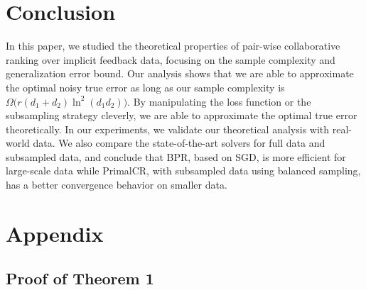\documentclass[conference]{IEEEtran}
\numberwithin{equation}{section}
\newtheorem{sampling strategy}{Sampling Strategy}
\begin{document}
\section{Conclusion}
\label{sec:conclusion}

In this paper, we studied the theoretical properties of pair-wise collaborative ranking  over implicit feedback data, focusing on the sample complexity and generalization error bound. Our analysis shows that we are able to approximate the optimal noisy true error as long as our sample complexity is $\Omega \big( r(d_1+d_2)\ln^2(d_1d_2) \big)$. By manipulating the loss function or the subsampling strategy cleverly, we are able to approximate the optimal true error theoretically. 
In our experiments, we validate our theoretical analysis with real-world data. We also compare the state-of-the-art solvers for full data and subsampled data, and conclude that \textsf{BPR}, based on SGD, is more efficient for large-scale data while \textsf{PrimalCR}, with subsampled data using balanced sampling,  has a better convergence behavior on smaller data.  



\newpage









\section{Appendix}

\subsection{Proof of Theorem 1}
\end{document}
